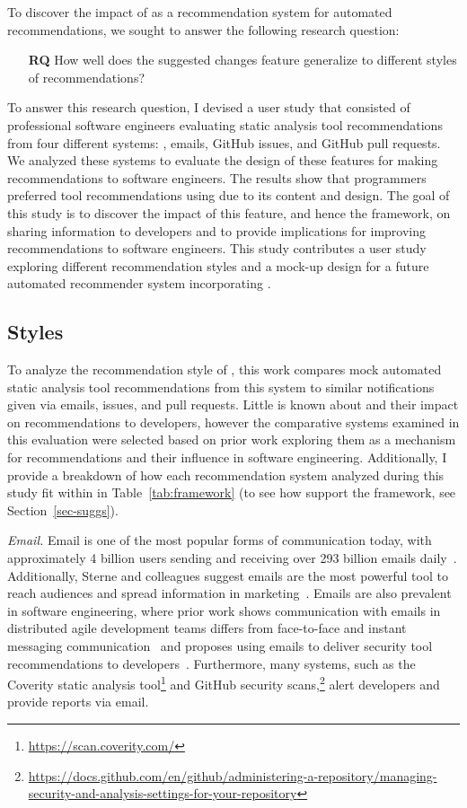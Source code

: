 To discover the impact of \suggs as a recommendation system for automated recommendations, we sought to answer the following research question:

\begin{itemize}
    \item[\textbf{RQ}] How well does the suggested changes feature generalize to different styles of recommendations?
\end{itemize}

To answer this research question, I devised a user study that consisted of professional software engineers evaluating static analysis tool recommendations from four different systems: \suggs, emails, GitHub issues, and GitHub pull requests. We analyzed these systems to evaluate the design of these features for making recommendations to software engineers. The results show that programmers preferred tool recommendations using \sugg due to its content and design. The goal of this study is to discover the impact of this feature, and hence the \framework framework, on sharing information to developers and to provide implications for improving recommendations to software engineers. This study contributes a user study exploring different recommendation styles and a mock-up design for a future automated recommender system incorporating \suggs.

\subsection{Styles}

To analyze the recommendation style of \suggs, this work compares mock automated static analysis tool recommendations from this system to similar notifications given via emails, issues, and pull requests. Little is known about \sugg and their impact on recommendations to developers, however the comparative systems examined in this evaluation were selected based on prior work exploring them as a mechanism for recommendations and their influence in software engineering. Additionally, I provide a breakdown of how each recommendation system analyzed during this study fit within \framework in Table~\ref{tab:framework} (to see how \suggs support the framework, see Section~\ref{sec-suggs}).

\textit{Email.} Email is one of the most popular forms of communication today, with approximately 4 billion users sending and receiving over 293 billion emails daily~\cite{EmailIsNotDead}. Additionally, Sterne and colleagues suggest emails are the most powerful tool to reach audiences and spread information in marketing~\cite{sterne2000email}. Emails are also prevalent in software engineering, where prior work shows communication with emails in distributed agile development teams differs from face-to-face and instant messaging communication~\cite{Niinimaki2011EmailAgile} and proposes using emails to deliver security tool recommendations to developers~\cite{Jordan2014Designing}. Furthermore, many systems, such as the Coverity static analysis tool\footnote{\url{https://scan.coverity.com/}} and GitHub security scans,\footnote{\url{https://docs.github.com/en/github/administering-a-repository/managing-security-and-analysis-settings-for-your-repository}} alert developers and provide reports via email.

